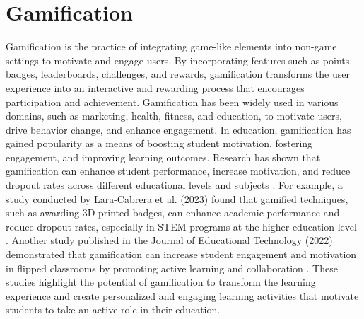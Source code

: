 \section{Gamification}
Gamification is the practice of integrating game-like elements into non-game settings to motivate and engage users. By incorporating features such as points, badges, leaderboards, challenges, and rewards, gamification transforms the user experience into an interactive and rewarding process that encourages participation and achievement. Gamification has been widely used in various domains, such as marketing, health, fitness, and education, to motivate users, drive behavior change, and enhance engagement. In education, gamification has gained popularity as a means of boosting student motivation, fostering engagement, and improving learning outcomes. Research has shown that gamification can enhance student performance, increase motivation, and reduce dropout rates across different educational levels and subjects \cite{lara2023badges}. For example, a study conducted by Lara-Cabrera et al. (2023) found that gamified techniques, such as awarding 3D-printed badges, can enhance academic performance and reduce dropout rates, especially in STEM programs at the higher education level \cite{lara2023badges}. Another study published in the Journal of Educational Technology (2022) demonstrated that gamification can increase student engagement and motivation in flipped classrooms by promoting active learning and collaboration \cite{jack2024gamification}. These studies highlight the potential of gamification to transform the learning experience and create personalized and engaging learning activities that motivate students to take an active role in their education.
